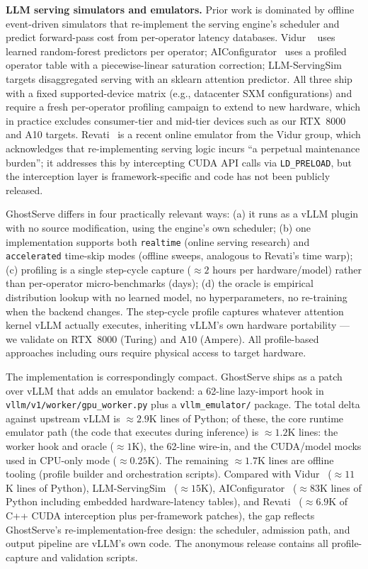 \documentclass[conference]{IEEEtran}
\newcommand{\sysname}{GhostServe}
\begin{document}
\textbf{LLM serving simulators and emulators.}
Prior work is dominated by offline event-driven simulators that
re-implement the serving engine's scheduler and predict
forward-pass cost from per-operator latency databases. Vidur
~\cite{agrawal2024vidur} uses learned random-forest predictors
per operator; AIConfigurator~\cite{nvidia2026aiconfigurator}
uses a profiled operator table with a piecewise-linear
saturation correction; LLM-ServingSim~\cite{cho2024llmservingsim}
targets disaggregated serving with an sklearn attention
predictor. All three ship with a fixed supported-device matrix
(e.g., datacenter SXM configurations) and require a fresh
per-operator profiling campaign to extend to new hardware,
which in practice excludes consumer-tier and mid-tier devices
such as our RTX~8000 and A10 targets.
Revati~\cite{agrawal2026revati} is a recent online emulator
from the Vidur group, which acknowledges that re-implementing
serving logic incurs ``a perpetual maintenance burden''; it
addresses this by intercepting CUDA API calls via
\texttt{LD\_PRELOAD}, but the interception layer is
framework-specific and code has not been publicly released.

\sysname{} differs in four practically relevant ways: (a) it
runs as a vLLM plugin with no source modification, using the
engine's own scheduler; (b) one implementation supports both
\texttt{realtime} (online serving research) and
\texttt{accelerated} time-skip modes (offline sweeps,
analogous to Revati's time warp); (c) profiling is a single
step-cycle capture (${\approx}2$ hours per hardware/model)
rather than per-operator micro-benchmarks (days); (d) the
oracle is empirical distribution lookup with no learned model,
no hyperparameters, no re-training when the backend changes.
The step-cycle profile captures whatever attention kernel
vLLM actually executes, inheriting vLLM's own hardware
portability --- we validate on RTX~8000 (Turing) and A10
(Ampere). All profile-based approaches including ours
require physical access to target hardware.

The implementation is correspondingly compact. \sysname{}
ships as a patch over vLLM that adds an emulator backend: a
62-line lazy-import hook in \texttt{vllm/v1/worker/gpu\_worker.py}
plus a \texttt{vllm\_emulator/} package. The total delta
against upstream vLLM is ${\approx}2.9$K lines of Python; of
these, the core runtime emulator path (the code that executes
during inference) is ${\approx}1.2$K lines: the worker hook
and oracle (${\approx}1$K), the 62-line wire-in, and the
CUDA/model mocks used in CPU-only mode (${\approx}0.25$K).
The remaining ${\approx}1.7$K lines are offline tooling
(profile builder and orchestration scripts). Compared with
Vidur~\cite{agrawal2024vidur} (${\approx}11$K lines of
Python), LLM-ServingSim~\cite{cho2024llmservingsim}
(${\approx}15$K), AIConfigurator~\cite{nvidia2026aiconfigurator}
(${\approx}83$K lines of Python including embedded
hardware-latency tables), and
Revati~\cite{agrawal2026revati}
(${\approx}6.9$K of C++ CUDA interception plus per-framework
patches), the gap reflects \sysname{}'s re-implementation-free
design: the scheduler, admission path, and output pipeline
are vLLM's own code. The anonymous release contains all
profile-capture and validation scripts.
\end{document}
